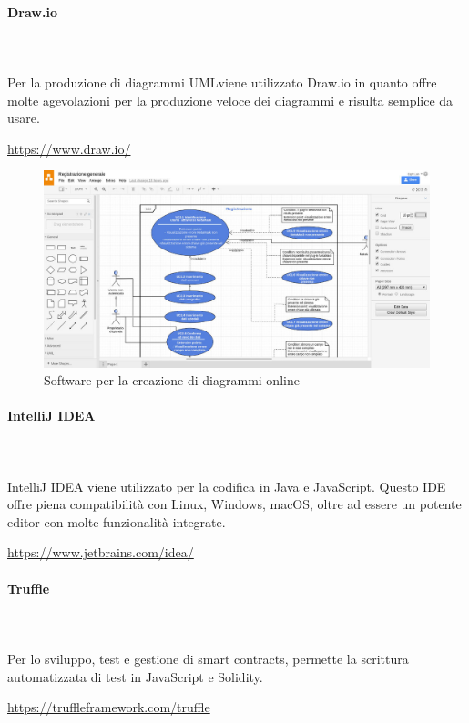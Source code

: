\paragraph{Draw.io} \mbox{}\\ \mbox{}\\
Per la produzione di diagrammi UML\glosp viene utilizzato Draw.io in quanto 
offre molte agevolazioni per la produzione veloce dei diagrammi e risulta 
semplice da usare. \newline
\centerline{\url{https://www.draw.io/}}
	\begin{figure}[H]
		\includegraphics[width=0.99\linewidth]{res/images/drawio.jpg}
		\caption{Software per la creazione di diagrammi online}
	\end{figure} 
		
\paragraph{IntelliJ IDEA} \mbox{}\\ \mbox{}\\
IntelliJ IDEA viene utilizzato per la codifica in Java e JavaScript. Questo 
IDE offre piena compatibilità con Linux, Windows, macOS, oltre ad essere un 
potente editor con molte funzionalità integrate. \newline
\centerline{\url{https://www.jetbrains.com/idea/}}

	
\paragraph{Truffle} \mbox{}\\ \mbox{}\\
Per lo sviluppo, test e gestione di smart contracts\glo, permette la scrittura automatizzata di test in JavaScript e Solidity\glo.\newline
\centerline{\url{https://truffleframework.com/truffle}}

